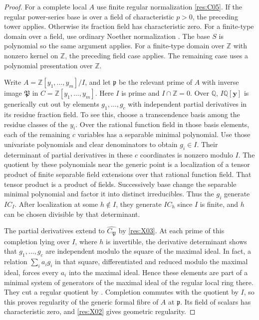 \documentclass[11pt,oneside,openany]{book}
\theoremstyle{definition}
\theoremstyle{remark}
\begin{document}
\begin{proof}
For a complete local \(A\) use finite regular normalization \ref{res:C05}. If the regular power-series base is over a field of characteristic \(p>0\), the preceding tower applies. Otherwise its fraction field has characteristic zero. For a finite-type domain over a field, use ordinary Noether normalization \cite[ALG-05-C03-R02]{p103}. The base \(S\) is polynomial so the same argument applies. For a finite-type domain over \(\mathbb Z\) with nonzero kernel on \(\mathbb Z\), the preceding field case applies. The remaining case uses a polynomial presentation over \(\mathbb Z\).

Write \(A=\mathbb Z[y_1,\ldots,y_m]/I\), and let \(\mathfrak p\) be the relevant prime of \(A\) with inverse image \(\mathfrak P\) in \(C=\mathbb Z[y_1,\ldots,y_m]\). Here \(I\) is prime and \(I\cap\mathbb Z=0\). Over \(\mathbb Q\), \(I\mathbb Q[\mathbf y]\) is generically cut out by elements \(g_1,\ldots,g_c\) with independent partial derivatives in its residue fraction field. To see this, choose a transcendence basis among the residue classes of the \(y_i\). Over the rational function field in those basis elements, each of the remaining \(c\) variables has a separable minimal polynomial. Use those univariate polynomials and clear denominators to obtain \(g_i\in I\). Their determinant of partial derivatives in these \(c\) coordinates is nonzero modulo \(I\). The quotient by these polynomials near the generic point is a localization of a tensor product of finite separable field extensions over that rational function field. That tensor product is a product of fields. Successively base change the separable minimal polynomial and factor it into distinct irreducibles. Thus the \(g_i\) generate \(IC_I\). After localization at some \(h\notin I\), they generate \(I C_h\) since \(I\) is finite, and \(h\) can be chosen divisible by that determinant.

The partial derivatives extend to \(\widehat{C_{\mathfrak P}}\) by \ref{res:X03}. At each prime of this completion lying over \(I\), where \(h\) is invertible, the derivative determinant shows that \(g_1,\ldots,g_c\) are independent modulo the square of the maximal ideal. In fact, a relation \(\sum_i a_i g_i\) in that square, differentiated and reduced modulo the maximal ideal, forces every \(a_i\) into the maximal ideal. Hence these elements are part of a minimal system of generators of the maximal ideal of the regular local ring there. They cut a regular quotient by \cite[CM-08]{core}. Completion commutes with the quotient by \(I\), so this proves regularity of the generic formal fibre of \(A\) at \(\mathfrak p\). Its field of scalars has characteristic zero, and \ref{res:X02} gives geometric regularity.
\end{proof}
\end{document}

